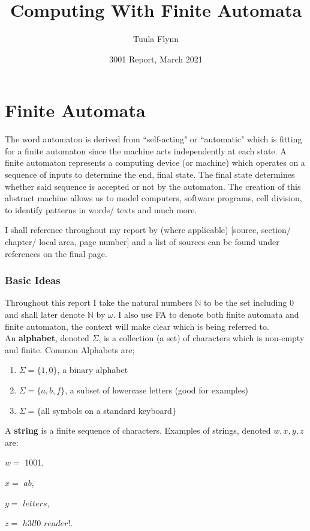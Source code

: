 \documentclass[a4paper,12pt]{report}
\theoremstyle{definition}
\begin{document}
\title{Computing With Finite Automata}
\author{Tuula Flynn}
\date{3001 Report, March 2021}
\maketitle


\chapter{Finite Automata}

The word automaton is derived from ``self-acting" or ``automatic" which is fitting for a finite automaton since the machine acts independently at each state. A finite automaton represents a computing device (or machine) which operates on a sequence of inputs to determine the end, final state. The final state determines whether said sequence is accepted or not by the automaton. The creation of this abstract machine allows us to model computers, software programs, cell division, to identify patterns in words/ texts and much more.

I shall reference throughout my report by (where applicable) [source, section/ chapter/ local area, page number] and a list of sources can be found under references on the final page.


\noindent[1, chapter 2, p.37][2]


\subsection{Basic Ideas}
\label{basics}
Throughout this report I take the natural numbers $\mathbb{N}$ to be the set including $0$ and shall later denote $\mathbb{N}$ by $\omega$. I also use FA to denote both finite automata and finite automaton, the context will make clear which is being referred to. \\

An \textbf{alphabet}, denoted $\Sigma$, is a collection (a set) of characters which is non-empty and finite. Common Alphabets are;
\begin{enumerate}[label={\alph*)}]
\item $\Sigma = \{1,0\}$, a binary alphabet
\item$\Sigma=\{a,b,f\}$, a subset of lowercase letters (good for examples)
\item$\Sigma= \{$all symbols on a standard keyboard$\}$
\end{enumerate}

A \textbf{string} is a finite sequence of characters. Examples of strings, denoted $w,x,y,z$ are:
\begin{itemize*}
\item[$w =$]1001,
\item[$x = $]$ab$,
\item[$y= $]$letters$,
\item[$z= $]$h3ll0$ $reader!$.
\end{itemize*}
\end{document}
